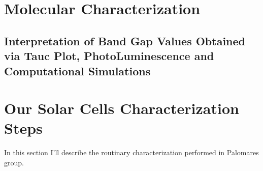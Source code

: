 \section{Molecular Characterization}
\subsection{Interpretation of Band Gap Values Obtained via Tauc Plot, PhotoLuminescence and Computational Simulations}\label{interpretation_bg}

%
%

\section{Our Solar Cells Characterization Steps}

	In this section I'll describe the routinary characterization performed in Palomares group.


